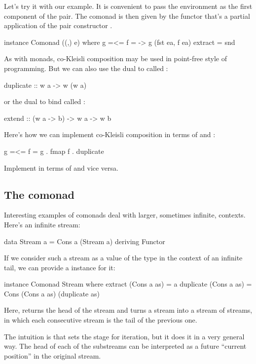 \documentclass[DaoFP]{subfiles}
\begin{document}
Let's try it with our example. It is convenient to pass the environment as the first component of the pair. The comonad is then given by the functor that's a partial application of the pair constructor .
\begin{haskell}
instance Comonad ((,) e) where
  g =<= f = \ea -> g (fst ea, f ea)
  extract = snd
\end{haskell}

As with monads, co-Kleisli composition may be used in point-free style of programming. But we can also use the dual to  called :
\begin{haskell}
  duplicate :: w a -> w (w a)
\end{haskell}
or the dual to bind called :
\begin{haskell}
  extend :: (w a -> b) -> w a -> w b
\end{haskell}
Here's how we can implement co-Kleisli composition in terms of  and :
\begin{haskell}
   g =<= f = g . fmap f . duplicate
\end{haskell}
\begin{exercise}
Implement  in terms of  and vice versa.
\end{exercise}
\subsection{The  comonad}
Interesting examples of comonads deal with larger, sometimes infinite, contexts. Here's an infinite stream:
\begin{haskell}
data Stream a = Cons a (Stream a)
    deriving Functor
\end{haskell}

If we consider such a stream as a value of the type  in the context of an infinite tail, we can provide a  instance for it:
\begin{haskell}
instance Comonad Stream where
  extract (Cons a as) = a
  duplicate (Cons a as) = Cons (Cons a as) (duplicate as)
\end{haskell}
Here,  returns the head of the stream and  turns a stream into a stream of streams, in which each consecutive stream is the tail of the previous one. 

The intuition is that  sets the stage for iteration, but it does it in a very general way. The head of each of the substreams can be interpreted as a future ``current position'' in the original stream. 
\end{document}
